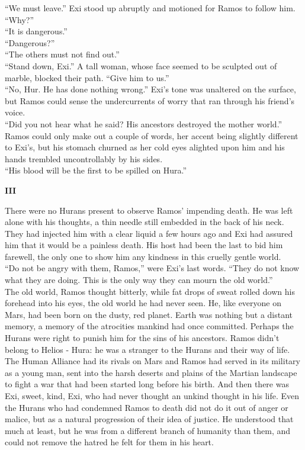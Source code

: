 “We must leave.” Exi stood up abruptly and motioned for Ramos to follow him.\\
“Why?”\\
“It is dangerous.”\\
“Dangerous?”\\
“The others must not find out.”\\
“Stand down, Exi.” A tall woman, whose face seemed to be sculpted out of marble, blocked their path. “Give him to us.”\\
“No, Hur. He has done nothing wrong.” Exi’s tone was unaltered on the surface, but Ramos could sense the undercurrents of worry that ran through his friend’s voice. \\
“Did you not hear what he said? His ancestors destroyed the mother world.”\\
Ramos could only make out a couple of words, her accent being slightly different to Exi’s, but his stomach churned as her cold eyes alighted upon him and his hands trembled uncontrollably by his sides.\\
“His blood will be the first to be spilled on Hura.”


\begin{center}
\Large \textbf{III}
\end{center}


There were no Hurans present to observe Ramos’ impending death. He was left alone with his thoughts, a thin needle still embedded in the back of his neck. They had injected him with a clear liquid a few hours ago and Exi had assured him that it would be a painless death. His host had been the last to bid him farewell, the only one to show him any kindness in this cruelly gentle world.\\
“Do not be angry with them, Ramos,” were Exi’s last words. “They do not know what they are doing. This is the only way they can mourn the old world.”\\
The old world, Ramos thought bitterly, while fat drops of sweat rolled down his forehead into his eyes, the old world he had never seen. He, like everyone on Mars, had been born on the dusty, red planet. Earth was nothing but a distant memory, a memory of the atrocities mankind had once committed. Perhaps the Hurans were right to punish him for the sins of his ancestors. Ramos didn’t belong to Helios - Hura: he was a stranger to the Hurans and their way of life. The Human Alliance had its rivals on Mars and Ramos had served in its military as a young man, sent into the harsh deserts and plains of the Martian landscape to fight a war that had been started long before his birth. And then there was Exi, sweet, kind, Exi, who had never thought an unkind thought in his life. Even the Hurans who had condemned Ramos to death did not do it out of anger or malice, but as a natural progression of their idea of justice. He understood that much at least, but he was from a different branch of humanity than them, and could not remove the hatred he felt for them in his heart.

